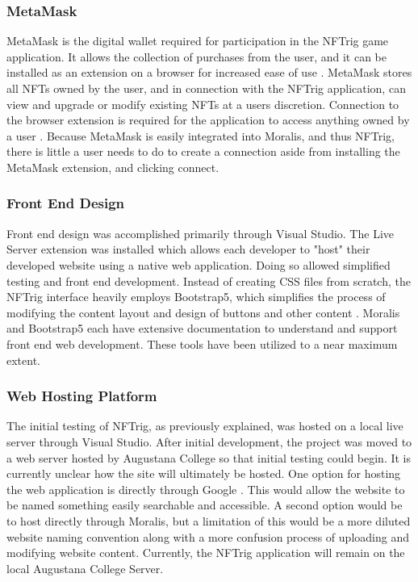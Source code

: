 \documentclass[acmsmall,nonacm]{acmart}
\begin{document}
\subsubsection{MetaMask}
MetaMask is the digital wallet required for participation in the NFTrig game application. It allows the collection of purchases from the user, and it can be installed as an extension on a browser for increased ease of use \cite{9354310}. MetaMask stores all NFTs owned by the user, and in connection with the NFTrig application, can view and upgrade or modify existing NFTs at a users discretion. Connection to the browser extension is required for the application to access anything owned by a user \cite{lee2019using}. Because MetaMask is easily integrated into Moralis, and thus NFTrig, there is little a user needs to do to create a connection aside from installing the MetaMask extension, and clicking connect.

\subsubsection{Front End Design}
Front end design was accomplished primarily through Visual Studio. The Live Server extension was installed which allows each developer to "host" their developed website using a native web application. Doing so allowed simplified testing and front end development. Instead of creating CSS files from scratch, the NFTrig interface heavily employs Bootstrap5, which simplifies the process of modifying the content layout and design of buttons and other content \cite{lepage1992exploring}. Moralis and Bootstrap5 each have extensive documentation to understand and support front end web development. These tools have been utilized to a near maximum extent.

\subsubsection{Web Hosting Platform}
 The initial testing of NFTrig, as previously explained, was hosted on a local live server through Visual Studio. After initial development, the project was moved to a web server hosted by Augustana College so that initial testing could begin. It is currently unclear how the site will ultimately be hosted. One option for hosting the web application is directly through Google \cite{STANDING2002151}. This would allow the website to be named something easily searchable and accessible. A second option would be to host directly through Moralis, but a limitation of this would be a more diluted website naming convention along with a more confusion process of uploading and modifying website content. Currently, the NFTrig application will remain on the local Augustana College Server.
\end{document}
